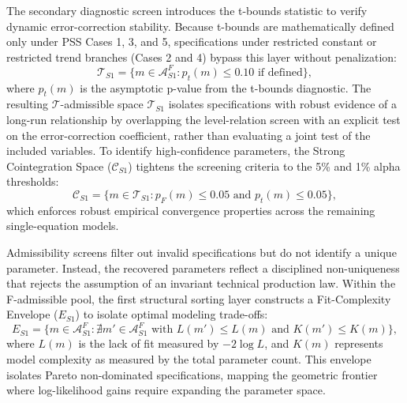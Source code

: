 \documentclass[11pt]{article}
\begin{document}
The secondary diagnostic screen introduces the t-bounds statistic to verify dynamic error-correction stability. Because t-bounds are mathematically defined only under PSS Cases 1, 3, and 5, specifications under restricted constant or restricted trend branches (Cases 2 and 4) bypass this layer without penalization:
\begin{equation}
\mathcal{T}_{S1} = \{ m \in \mathcal{A}^{F}_{S1} : p_t(m) \leq 0.10 \text{ if defined} \},
\label{eq:T_S1}
\end{equation}
where $p_t(m)$ is the asymptotic p-value from the t-bounds diagnostic. The resulting $\mathcal{T}$-admissible space $\mathcal{T}_{S1}$ isolates specifications with robust evidence of a long-run relationship by overlapping the level-relation screen with an explicit test on the error-correction coefficient, rather than evaluating a joint test of the included variables. To identify high-confidence parameters, the Strong Cointegration Space ($\mathcal{C}_{S1}$) tightens the screening criteria to the 5\% and 1\% alpha thresholds:
\begin{equation}
\mathcal{C}_{S1} = \{ m \in \mathcal{T}_{S1} : p_F(m) \leq 0.05 \text{ and } p_t(m) \leq 0.05 \},
\label{eq:C_S1}
\end{equation}
which enforces robust empirical convergence properties across the remaining single-equation models.

Admissibility screens filter out invalid specifications but do not identify a unique parameter. Instead, the recovered parameters reflect a disciplined non-uniqueness that rejects the assumption of an invariant technical production law. Within the F-admissible pool, the first structural sorting layer constructs a Fit-Complexity Envelope ($E_{S1}$) to isolate optimal modeling trade-offs:
\begin{equation}
E_{S1} = \{ m \in \mathcal{A}^{F}_{S1} : \nexists m' \in \mathcal{A}^{F}_{S1} \text{ with } L(m') \leq L(m) \text{ and } K(m') \leq K(m) \},
\label{eq:E_S1}
\end{equation}
where $L(m)$ is the lack of fit measured by $-2\log L$, and $K(m)$ represents model complexity as measured by the total parameter count. This envelope isolates Pareto non-dominated specifications, mapping the geometric frontier where log-likelihood gains require expanding the parameter space.
\end{document}
